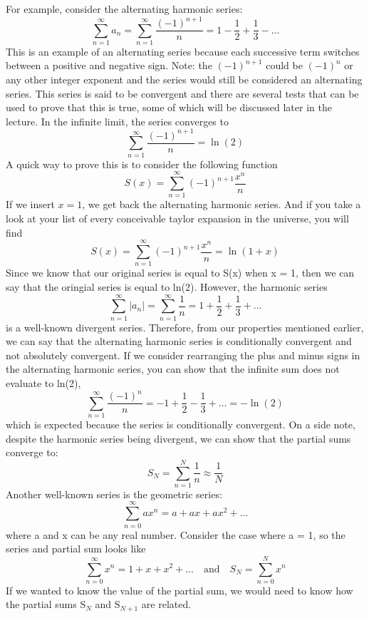 \documentclass{article}
\newcommand{\be}{\begin{equation}}
\newcommand{\ee}{\end{equation}}
\begin{document}
For example, consider the alternating harmonic series:
\be
\sum_{n=1}^{\infty} a_n = \sum_{n = 1}^{\infty} \frac{(-1)^{n+1}}{n} = 1 - \frac{1}{2} + \frac{1}{3} - \hdots
\ee
This is an example of an alternating series because each successive term switches between a positive and negative sign.
Note: the $(-1)^{n+1}$ could be $(-1)^{n}$ or any other integer exponent and the series would still be considered an alternating series.
This series is said to be convergent and there are several tests that can be used to prove that this is true, some of which will be discussed later in the lecture.
In the infinite limit, the series converges to
\be
\sum_{n = 1}^{\infty} \frac{(-1)^{n+1}}{n} = \ln(2)
\ee
A quick way to prove this is to consider the following function
\be
S(x) = \sum_{n = 1}^{\infty} (-1)^{n+1} \frac{x^n}{n}
\ee
If we insert $x = 1$, we get back the alternating harmonic series.
And if you take a look at your list of every conceivable taylor expansion in the universe, you will find
\be
S(x) = \sum_{n = 1}^{\infty} (-1)^{n+1} \frac{x^n}{n} = \ln(1+x)
\ee
Since we know that our original series is equal to S(x) when x = 1, then we can say that the oringial series is equal to ln(2).
However, the harmonic series
\be
\sum_{n=1}^{\infty} |a_n| = \sum_{n = 1}^{\infty} \frac{1}{n} = 1 + \frac{1}{2} + \frac{1}{3} + \hdots
\ee
is a well-known divergent series.
Therefore, from our properties mentioned earlier, we can say that the alternating harmonic series is conditionally convergent and not absolutely convergent.
If we consider rearranging the plus and minus signs in the alternating harmonic series, you can show that the infinite sum does not evaluate to ln(2),
\be
\sum_{n = 1}^{\infty} \frac{(-1)^{n}}{n} = -1 + \frac{1}{2} - \frac{1}{3} + \hdots = -\ln(2)
\ee
which is expected because the series is conditionally convergent.
On a side note, despite the harmonic series being divergent, we can show that the partial sums converge to:
\be
S_N = \sum_{n=1}^{N} \frac{1}{n} \approx \frac{1}{N}
\ee
Another well-known series is the geometric series:
\be
\sum_{n=0}^{\infty} a x^n = a + ax + ax^2 + \hdots
\ee
where a and x can be any real number.
Consider the case where a = 1, so the series and partial sum looks like
\be
\sum_{n=0}^{\infty} x^n = 1 + x + x^2 + \hdots \quad \text{and} \quad S_N = \sum_{n=0}^{N} x^n
\ee
If we wanted to know the value of the partial sum, we would need to know how the partial sums S$_N$ and S$_{N+1}$ are related.
\end{document}
